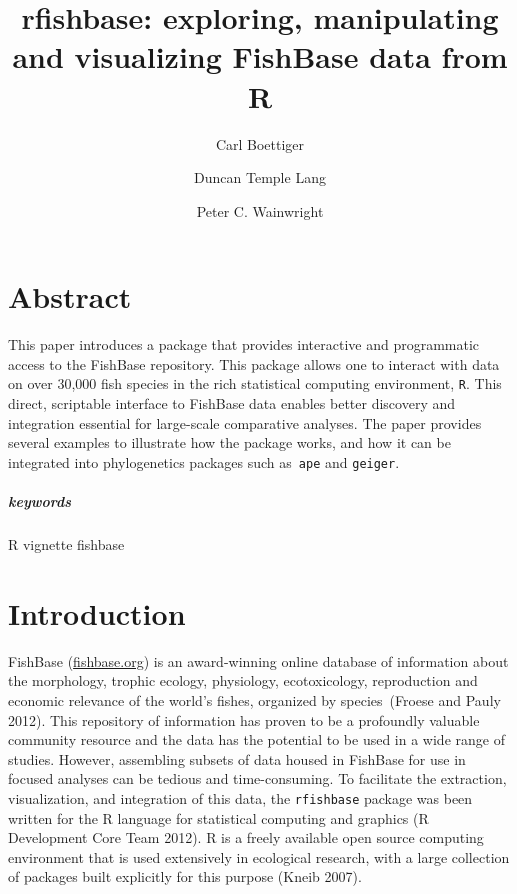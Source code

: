 \documentclass[author-year]{elsarticle} %
\begin{document}
\begin{frontmatter}
  \title{rfishbase: exploring, manipulating and visualizing FishBase data from R}
  \author[cpb]{Carl Boettiger}
  \author[stats]{Duncan Temple Lang}
  \author[cpb]{Peter C. Wainwright}
  \address[cpb]{Center for Population Biology, University of California, Davis, California 95616}
  \address[stats]{Department of Statistics, University of California, Davis, California 95616}
 \end{frontmatter}


\section{Abstract}

This paper introduces a package that provides interactive and
programmatic access to the FishBase repository. This package allows one
to interact with data on over 30,000 fish species in the rich
statistical computing environment, \texttt{R}. This direct, scriptable
interface to FishBase data enables better discovery and integration
essential for large-scale comparative analyses. The paper provides
several examples to illustrate how the package works, and how it can be
integrated into phylogenetics packages such as~\texttt{ape} and
\texttt{geiger}.

\subparagraph{keywords}

R \textbar{} vignette \textbar{} fishbase

\section{Introduction}

FishBase (\href{http://fishbase.org}{fishbase.org}) is an award-winning
online database of information about the morphology, trophic ecology,
physiology, ecotoxicology, reproduction and economic relevance of the
world's fishes, organized by species~(Froese and Pauly 2012). This
repository of information has proven to be a profoundly valuable
community resource and the data has the potential to be used in a wide
range of studies. However, assembling subsets of data housed in FishBase
for use in focused analyses can be tedious and time-consuming. To
facilitate the extraction, visualization, and integration of this data,
the \texttt{rfishbase} package was been written for the R language for
statistical computing and graphics (R Development Core Team 2012). R is
a freely available open source computing environment that is used
extensively in ecological research, with a large collection of packages
built explicitly for this purpose (Kneib 2007).
\end{document}
